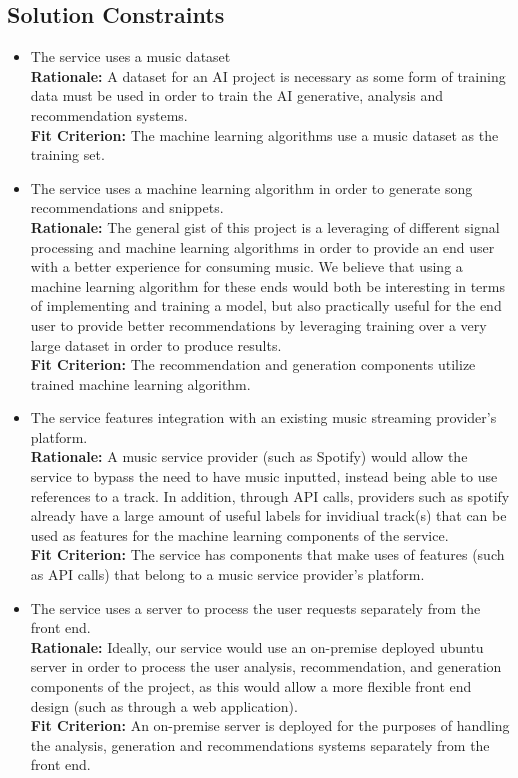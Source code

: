 \documentclass[12pt]{article}
\begin{document}
\subsection{Solution Constraints}
\begin{itemize}

  \item The service uses a music dataset
  \\ \textbf{Rationale:} A dataset for an AI project is necessary as some form of training data must be used 
  in order to train the AI generative, analysis and recommendation systems. 
  \\ \textbf{Fit Criterion:} The machine learning algorithms use a music dataset as the training set. 

  \item The service uses a machine learning algorithm in order to generate song recommendations and snippets. 
  \\ \textbf{Rationale:} The general gist of this project is a leveraging of different signal processing and machine learning
  algorithms in order to provide an end user with a better experience for consuming music. We believe that using a machine 
  learning algorithm for these ends would both be interesting in terms of implementing and training a model, but also practically
  useful for the end user to provide better recommendations by leveraging training over a very large dataset in order to produce results. 
  \\\textbf{Fit Criterion:} The recommendation and generation components utilize trained machine learning algorithm. 

  \item The service features integration with an existing music streaming provider's platform. 
  \\ \textbf{Rationale:} A music service provider (such as Spotify) would allow the service to bypass the need to have
  music inputted, instead being able to use references to a track. In addition, through API calls, providers such as spotify
  already have a large amount of useful labels for invidiual track(s) that can be used as features for the machine learning
  components of the service.  
  \\ \textbf{Fit Criterion:} The service has components that make uses of features (such as API calls) 
  that belong to a music service provider's platform. 

  \item The service uses a server to process the user requests separately from the front end.
  \\ \textbf{Rationale:} Ideally, our service would use an on-premise deployed ubuntu server in order to process the user 
  analysis, recommendation, and generation components of the project, as this would allow a more flexible front end design
  (such as through a web application). 
  \\ \textbf{Fit Criterion:} An on-premise server is deployed for the purposes of handling the analysis, generation and recommendations
  systems separately from the front end. 

\end{itemize}
\end{document}

